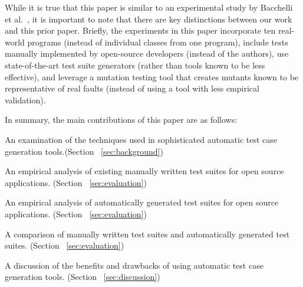 
While it is true that this paper is similar to an experimental study by Bacchelli et al.~\cite{bacchelli2008}, it is important to note that there are key distinctions between our work and this prior paper.  Briefly, the experiments in this paper incorporate ten real-world programs (instead of individual classes from one program), include tests manually implemented by open-source developers (instead of the authors), use state-of-the-art test suite generators (rather than tools known to be less effective), and leverage a mutation testing tool that creates mutants known to be representative of real faults (instead of using a tool with less empirical validation).  %



In summary, the main contributions of this paper are as follows:
\squishlist 
\item An examination of the techniques used in sophisticated automatic test case generation tools.(Section ~\ref{sec:background})
\item An empirical analysis of existing manually written test suites for open source applications. (Section ~\ref{sec:evaluation})
\item An empirical analysis of automatically generated test suites for open source applications. (Section ~\ref{sec:evaluation})
\item A comparison of manually written test suites and automatically generated test suites. (Section ~\ref{sec:evaluation})
\item A discussion of the benefits and drawbacks of using automatic test case generation tools. (Section ~\ref{sec:discussion})
\squishend 

